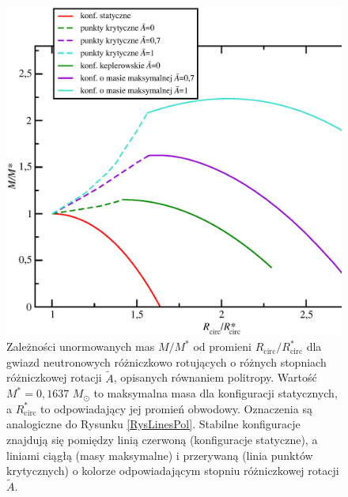 \documentclass{bachelor_thesis}
\begin{document}
            \begin{figure}[h!]
            \centering
            \includegraphics[scale=.4]{figures/RysMofRpol.eps}
            \caption{Zależności unormowanych mas $M/M^*$ od promieni $R_\textrm{circ}/R^*_\textrm{circ}$ dla gwiazd neutronowych różniczkowo rotujących o różnych stopniach różniczkowej rotacji $\tilde{A}$, opisanych równaniem politropy. Wartość $M^*=0,1637$ $M_\odot$ to maksymalna masa dla konfiguracji statycznych, a $R^*_\textrm{circ}$ to odpowiadający jej promień obwodowy. Oznaczenia są analogiczne do Rysunku \ref{RysLinesPol}. Stabilne konfiguracje znajdują się pomiędzy linią czerwoną (konfiguracje statyczne), a liniami ciągłą (masy maksymalne) i przerywaną (linia punktów krytycznych) o kolorze odpowiadającym stopniu różniczkowej rotacji $\tilde{A}$.}
            \label{RysMofRpol}
            \end{figure}
\end{document}
